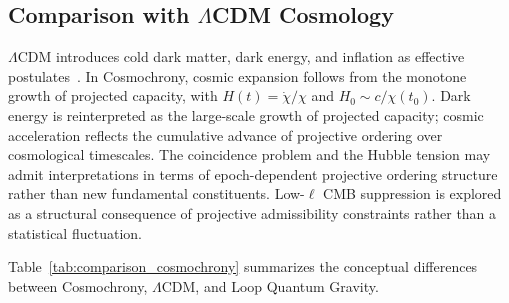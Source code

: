 \subsection{Comparison with \texorpdfstring{$\Lambda$}{Λ}CDM Cosmology}
  \label{subsec:comparison-with-lambdacdm-cosmology}

  $\Lambda$CDM introduces cold dark matter, dark energy, and inflation as effective
  postulates~\cite{peebles1993principles,planck2020results}.
  In Cosmochrony, cosmic expansion follows from the monotone growth of projected capacity,
  with $H(t) = \dot{\chi}/\chi$ and $H_0 \sim c/\chi(t_0)$.
  Dark energy is reinterpreted as the large-scale growth of projected capacity;
  cosmic acceleration reflects the cumulative advance of projective ordering over
  cosmological timescales.
  The coincidence problem and the Hubble tension may admit interpretations
  in terms of epoch-dependent projective ordering structure rather than
  new fundamental constituents.
  Low-$\ell$ CMB suppression is explored as a structural consequence of
  projective admissibility constraints rather than a statistical fluctuation.

  Table~\ref{tab:comparison_cosmochrony} summarizes the conceptual
  differences between Cosmochrony, $\Lambda$CDM, and Loop Quantum Gravity.
